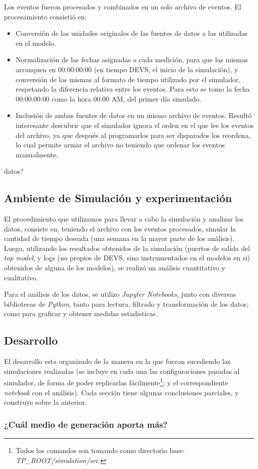 Los eventos fueron procesados y combinados en un solo archivo de eventos. El
procesamiento consistió en: \begin{itemize} \item Conversión de las unidades
originales de las fuentes de datos a las utilizadas en el modelo. \item
Normalización de las fechas asignadas a cada medición, para que las mismas
arranquen en 00:00:00:00 (en tiempo DEVS, el inicio de la simulación), y
conversión de las mismas al formato de tiempo utilizado por el simulador,
respetando la diferencia relativa entre los eventos. Para esto se tomo la
fecha 00:00:00:00 como la hora 00:00 AM, del primer día simulado. \item
Inclusión de ambas fuentes de datos en un mismo archivo de eventos. Resultó
interesante descubrir que el simulador ignora el orden en el que lee los
eventos del archivo, ya que después al programarlos para ser disparados los
reordena, lo cual permite armar el archivo no teniendo que ordenar los
eventos manualmente. \end{itemize} %
datos?

\subsection{Ambiente de Simulación y experimentación} El procedimiento que
utilizamos para llevar a cabo la simulación y analizar los datos, consiste
en, teniendo el archivo con los eventos procesados, simular la cantidad de
tiempo deseada (una semana en la mayor parte de los análisis). Luego,
utilizando los resultados obtenidos de la simulación (puertos de salida del
\textit{top model}, y logs (no propios de DEVS, sino instrumentados en el
modelos en si) obtenidos de alguna de los modelos), se realizó un análisis
cuantitativo y cualitativo.

Para el análisis de los datos, se utilizo \textit{Jupyter Notebooks}, junto
con diversas bibliotecas de \textit{Python}, tanto para lectura, filtrado y
transformación de los datos; como para graficar y obtener medidas
estadisticas.

\subsection{Desarrollo} El desarrollo esta organizado de la manera en la que
fueron sucediendo las simulaciones realizadas (se incluye en cada una las
configuraciones pasadas al simulador, de forma de poder replicarlas
fácilmente\footnote{Todos los comandos son tomando como directorio base: \textit{TP\_ROOT/simulation/src}.}; y el correspondiente \textit{notebook} con el análisis). Cada
sección tiene algunas conclusiones parciales, y construye sobre la anterior.

\subsubsection{¿Cuál medio de generación aporta más?}
